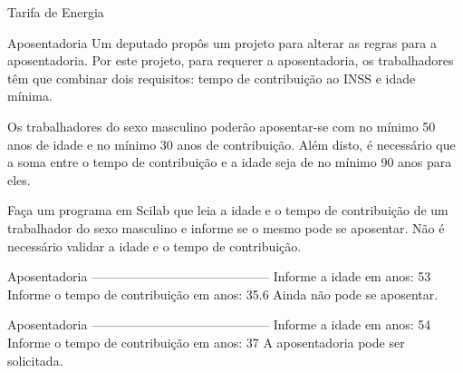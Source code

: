 \documentclass[11pt,fleqn]{practice}
\begin{document}
\begin{task}[breakable]{Tarifa de Energia}{}

  \tcblower
  \solution
\end{task}

\begin{task}[breakable]{Aposentadoria}{}
  Um deputado propôs um projeto para alterar as regras para a
  aposentadoria. Por este projeto, para requerer a aposentadoria, os
  trabalhadores têm que combinar dois requisitos: tempo de contribuição
  ao INSS e idade mínima.

  Os trabalhadores do sexo masculino poderão aposentar-se com no mínimo
  50 anos de idade e no mínimo 30 anos de contribuição. Além disto, é
  necessário que a soma entre o tempo de contribuição e a idade seja de
  no mínimo 90 anos para eles.

  Faça um programa em Scilab que leia a idade e o tempo de contribuição
  de um trabalhador do sexo masculino e informe se o mesmo pode se
  aposentar. Não é necessário validar a idade e o tempo de contribuição.

  \begin{runexample}
Aposentadoria
------------------------------------------
Informe a idade em anos: 53
Informe o tempo de contribuição em anos: 35.6
Ainda não pode se aposentar.
  \end{runexample}

  \begin{runexample}
Aposentadoria
------------------------------------------
Informe a idade em anos: 54
Informe o tempo de contribuição em anos: 37
A aposentadoria pode ser solicitada.
  \end{runexample}

  \tcblower
  \solution
\end{task}
\end{document}
